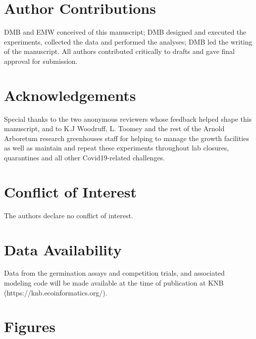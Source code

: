 \documentclass{article}[11pt]
\begin{document}
\section*{Author Contributions} 
DMB and EMW conceived of this manuscript; DMB designed and executed the experiments, collected the data and performed the analyses; DMB led the writing of the manuscript. All authors contributed critically to drafts and gave final approval for submission.

\section*{Acknowledgements}
Special thanks to the two anonymous reviewers whose feedback helped shape this manuscript, and to K.J Woodruff, L. Toomey and the rest of the Arnold Arboretum research greenhouses staff for helping to manage the growth facilities as well as maintain and repeat these experiments throughout lab closures, quarantines and all other Covid19-related challenges.

\section*{Conflict of Interest}
The authors declare no conflict of interest.


\section*{Data Availability}
Data from the germination assays and competition trials, and associated modeling code will be made available at the time of publication at KNB (https://knb.ecoinformatics.org/).


\section*{Figures}
\end{document}

